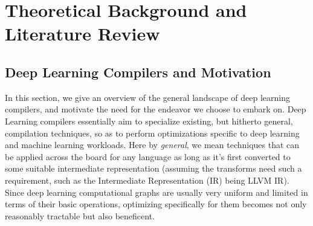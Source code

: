\documentclass[12pt,a4paper,twoside,openright,bibliography=totocnumbered]{report}
\begin{document}


\chapter{Theoretical Background and Literature Review}

\section{Deep Learning Compilers and Motivation}
In this section, we give an overview of the general landscape of deep learning compilers, and motivate the need for the endeavor we choose to embark on. Deep Learning compilers essentially aim to specialize existing, but hitherto general, compilation techniques, so as to perform optimizations specific to deep learning and machine learning workloads. Here by \textit{general}, we mean techniques that can be applied across the board for any language as long as it's first converted to some suitable intermediate representation (assuming the transforms need such a requirement, such as the Intermediate Representation (IR) being LLVM IR\cite{lattner2004llvm}). Since deep learning computational graphs are usually very uniform and limited in terms of their basic operations, optimizing specifically for them becomes not only reasonably tractable but also beneficent. 
\end{document}
